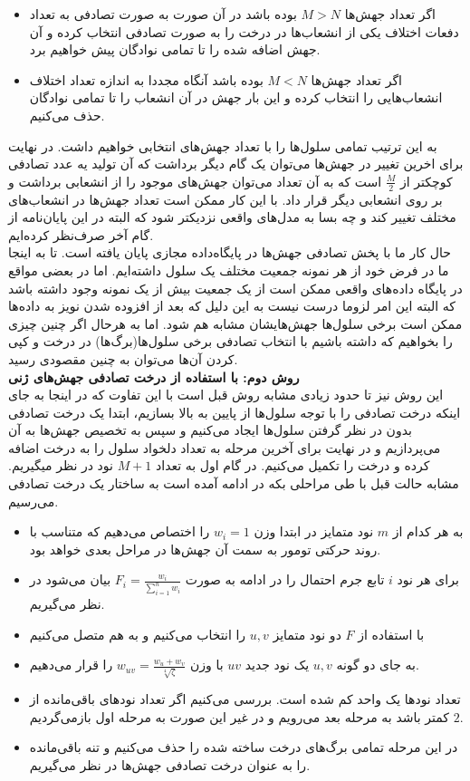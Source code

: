 \begin{itemize}
	\item اگر تعداد جهش‌ها $M>N$ بوده باشد در آن صورت به صورت تصادفی به تعداد دفعات اختلاف یکی از انشعاب‌ها در درخت را به صورت تصادفی انتخاب کرده و آن جهش اضافه شده را تا تمامی نوادگان پیش خواهیم برد.
	\item اگر تعداد جهش‌ها $M<N$ بوده باشد آنگاه مجددا به اندازه تعداد اختلاف انشعاب‌هایی را انتخاب کرده و این بار جهش در آن انشعاب را تا تمامی نوادگان حذف می‌کنیم.  
\end{itemize}
به این ترتیب تمامی سلول‌ها را با تعداد جهش‌های انتخابی خواهیم داشت. در نهایت برای اخرین تغییر در جهش‌ها می‌توان یک گام دیگر برداشت که آن تولید یه عدد تصادفی کوچکتر از $\frac{M}{2}$ است که به آن تعداد می‌توان جهش‌های موجود را از انشعابی برداشت و بر روی انشعابی دیگر قرار داد. با این کار ممکن است تعداد جهش‌ها در انشعاب‌های مختلف تغییر کند و چه بسا به مدل‌های واقعی نزدیکتر شود که البته در این پایان‌نامه از گام آخر صرف‌نظر کرده‌ایم.
\\
حال کار ما با پخش تصادفی جهش‌ها در پایگاه‌داده مجازی پایان یافته است. تا به اینجا ما در فرض خود از هر نمونه جمعیت مختلف یک سلول داشته‌ایم. اما  در بعضی مواقع در پایگاه داده‌های واقعی ممکن است از یک جمعیت بیش از یک نمونه وجود داشته باشد که البته این امر لزوما درست نیست به این دلیل که بعد از افزوده شدن نویز به داده‌ها ممکن است برخی سلول‌ها جهش‌هایشان مشابه هم شود. اما به هرحال اگر چنین چیزی را بخواهیم که داشته باشیم با انتخاب تصادفی برخی سلول‌ها(برگ‌ها) در درخت و کپی کردن آن‌ها می‌توان به چنین مقصودی رسید.
\vspace{20pt}
\\ \textbf{روش دوم: با استفاده از درخت تصادفی جهش‌های ژنی}	
\\
این روش نیز تا حدود زیادی مشابه روش قبل است با این تفاوت که در اینجا به جای اینکه درخت تصادفی را با توجه سلول‌ها از پایین به بالا بسازیم، ابتدا یک درخت تصادفی بدون در نظر گرفتن سلول‌ها ایجاد می‌کنیم و سپس به تخصیص جهش‌ها به آن می‌پردازیم و در نهایت برای آخرین مرحله به تعداد دلخواد سلول را به درخت اضافه کرده و درخت را تکمیل می‌کنیم. در گام اول به تعداد $M+1$ نود در نظر میگیریم. مشابه حالت قبل با طی مراحلی بکه در ادامه آمده است به ساختار یک درخت تصادفی می‌رسیم.
\begin{itemize}
	\item به هر کدام از $m$ نود متمایز در ابتدا وزن $w_i=1$ را اختصاص می‌دهیم که متناسب با روند حرکتی تومور به سمت آن جهش‌ها در مراحل بعدی خواهد بود.
	\item برای هر نود ‌$i$ تابع جرم احتمال را در ادامه به صورت $F_i=\frac{w_i}{\sum_{i=1}^{n}w_i}$ بیان می‌شود در نظر می‌گیریم.
	\item با استفاده از $F$ دو نود متمایز $u, v$ را انتخاب می‌کنیم و به هم متصل می‌کنیم
	\item به جای دو گونه $u, v$ یک نود جدید $uv$ با وزن $w_{uv}=\frac{w_u+w_v}{\sqrt[4]{\zeta}}$ را قرار می‌دهیم.
	\item تعداد نود‌ها یک واحد کم شده است. بررسی می‌کنیم اگر تعداد نود‌های باقی‌مانده از $2$ کمتر باشد به مرحله بعد می‌رویم و در غیر این صورت به مرحله اول بازمی‌گردیم.
	\item در این مرحله تمامی برگ‌های درخت ساخته شده را حذف می‌کنیم و تنه باقی‌مانده را به عنوان درخت تصادفی جهش‌ها در نظر می‌گیریم.
\end{itemize}

